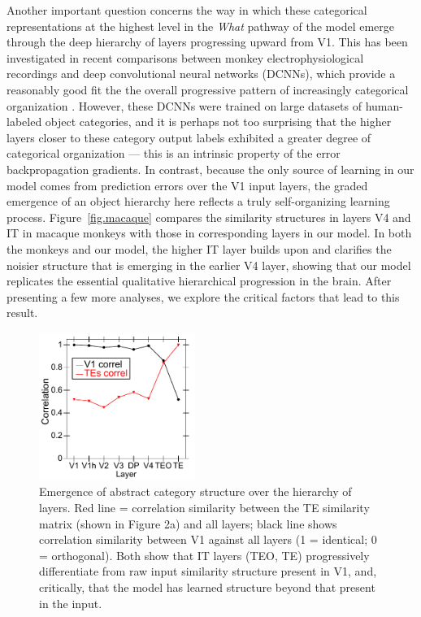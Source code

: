 \documentclass[11pt,twoside]{article}
\newif\myifpdf
\begin{document}
Another important question concerns the way in which these categorical representations at the highest level in the \emph{What} pathway of the model emerge through the deep hierarchy of layers progressing upward from V1.  This has been investigated in recent comparisons between monkey electrophysiological recordings and deep convolutional neural networks (DCNNs), which provide a reasonably good fit the the overall progressive pattern of increasingly categorical organization \citep{CadieuHongYaminsEtAl14}.  However, these DCNNs were trained on large datasets of human-labeled object categories, and it is perhaps not too surprising that the higher layers closer to these category output labels exhibited a greater degree of categorical organization --- this is an intrinsic property of the error backpropagation gradients.  In contrast, because the only source of learning in our model comes from prediction errors over the V1 input layers, the graded emergence of an object hierarchy here reflects a truly self-organizing learning process.  Figure~\ref{fig.macaque} compares the similarity structures in layers V4 and IT in macaque monkeys \citep{CadieuHongYaminsEtAl14} with those in corresponding layers in our model.  In both the monkeys and our model, the higher IT layer builds upon and clarifies the noisier structure that is emerging in the earlier V4 layer, showing that our model replicates the essential qualitative hierarchical progression in the brain.  After presenting a few more analyses, we explore the critical factors that lead to this result.

\begin{figure}
  \centering\includegraphics[width=2in]{fig_06} %
  \caption{Emergence of abstract category structure over the hierarchy of layers.  Red line = correlation similarity between the TE similarity matrix (shown in Figure 2a) and all layers; black line shows correlation similarity between V1 against all layers (1 = identical; 0 = orthogonal). Both show that IT layers (TEO, TE) progressively differentiate from raw input similarity structure present in V1, and, critically, that the model has learned structure beyond that present in the input.}
  \label{fig.simat-lays}
\end{figure}
\end{document}
